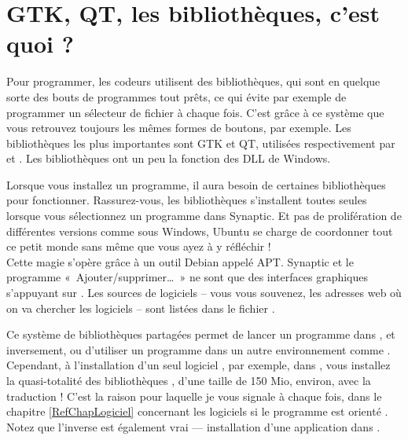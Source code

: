 \section{GTK, QT, les bibliothèques, c'est quoi ?}
\label{RefLibGraphique}
Pour programmer, les codeurs utilisent des bibliothèques, qui sont en quelque sorte des bouts de programmes tout prêts, ce qui évite par exemple de programmer un sélecteur de fichier à chaque fois. C'est grâce à ce système que vous retrouvez toujours les mêmes formes de boutons, par exemple. Les bibliothèques les plus importantes sont GTK et QT, utilisées respectivement par  et . Les bibliothèques ont un peu la fonction des DLL de Windows. \par
Lorsque vous installez un programme, il aura besoin de certaines bibliothèques pour fonctionner. Rassurez-vous, les bibliothèques s'installent toutes seules lorsque vous sélectionnez un programme dans Synaptic. Et pas de prolifération de différentes versions comme sous Windows, Ubuntu se charge de coordonner tout ce petit monde sans même que vous ayez à y réfléchir !\\
Cette magie s'opère grâce à un outil Debian appelé APT. Synaptic et le programme «~Ajouter/supprimer\dots{}~» ne sont que des interfaces graphiques s'appuyant sur . Les sources de logiciels -- vous vous souvenez, les adresses web où on va chercher les logiciels -- sont listées dans le fichier  .\par
Ce système de bibliothèques partagées permet de lancer un programme  dans , et inversement, ou d'utiliser un programme  dans un autre environnement comme . Cependant, à l'installation d'un seul logiciel , par exemple, dans , vous installez la quasi-totalité des bibliothèques , d'une taille de 150 Mio, environ, avec la traduction ! C'est la raison pour laquelle je vous signale à chaque fois, dans le chapitre \ref{RefChapLogiciel} concernant les logiciels si le programme est orienté . Notez que l'inverse est également vrai --- installation d'une application  dans .

